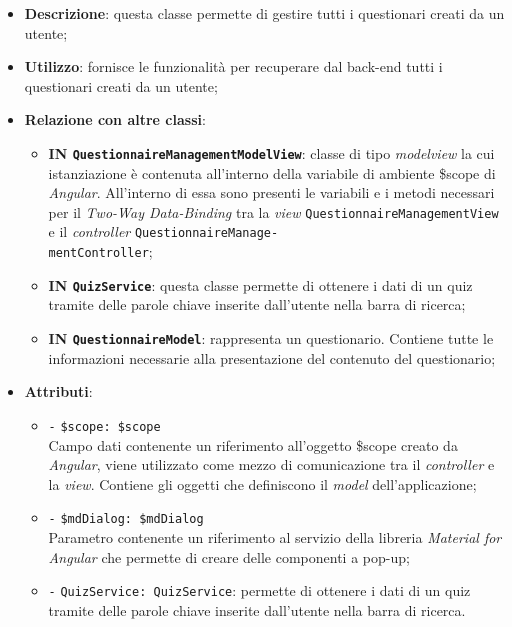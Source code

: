 \begin{itemize}
	\item \textbf{Descrizione}: questa classe permette di gestire tutti i questionari creati da un utente; 
	\item \textbf{Utilizzo}: fornisce le funzionalità per recuperare dal back-end tutti i questionari creati da un utente;
	\item \textbf{Relazione con altre classi}:
	\begin{itemize}
		\item \textbf{IN \texttt{QuestionnaireManagementModelView}}: classe di tipo \textit{modelview} la cui istanziazione è contenuta all'interno della variabile di ambiente \$scope di \textit{Angular}. All'interno di essa sono presenti le variabili e i metodi necessari per il \textit{Two-Way Data-Binding} tra la \textit{view} \texttt{QuestionnaireManagementView} e il \textit{controller} \texttt{QuestionnaireManage-\\mentController};
		\item \textbf{IN \texttt{QuizService}}: questa classe permette di ottenere i dati di un quiz tramite delle parole chiave inserite dall'utente nella barra di ricerca;
		\item \textbf{IN \texttt{QuestionnaireModel}}: rappresenta un questionario. Contiene tutte le informazioni necessarie alla presentazione del contenuto del questionario;
	\end{itemize}
	\item \textbf{Attributi}:
	\begin{itemize}
		\item \texttt{-} \texttt{\$scope: \$scope} \\
		Campo dati contenente un riferimento all'oggetto \$scope creato da \textit{Angular}, viene utilizzato come mezzo di comunicazione tra il \textit{controller} e la \textit{view}. Contiene gli oggetti che definiscono il \textit{model} dell'applicazione;
		\item \texttt{-} \texttt{\$mdDialog: \$mdDialog} \\
		Parametro contenente un riferimento al servizio della libreria \textit{Material for Angular} che permette di creare delle componenti a pop-up;
		\item \texttt{-}	 \texttt{QuizService: QuizService}: permette di ottenere i dati di un quiz tramite delle parole chiave inserite dall'utente nella barra di ricerca.
	\end{itemize}

\end{itemize}

